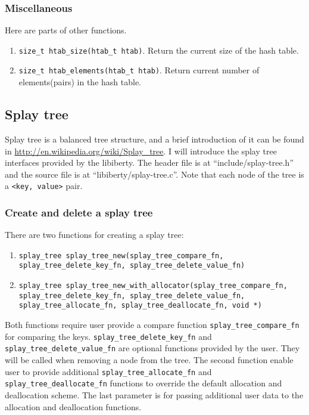 \documentclass[11pt]{article}
\begin{document}
\subsubsection{Miscellaneous}
Here are parts of other functions.
\begin{enumerate}
\item \texttt{size\_t htab\_size(htab\_t htab)}. Return the current size of the hash table.
\item \texttt{size\_t htab\_elements(htab\_t htab)}. Return current number of elements(pairs) in the hash table.
\end{enumerate}

\subsection{Splay tree}
Splay tree is a balanced tree structure, and a brief introduction of it can be found in
\url{http://en.wikipedia.org/wiki/Splay_tree}. I will introduce the splay tree interfaces provided by the libiberty.
The header file is at ``include/splay-tree.h'' and the source file is at ``libiberty/splay-tree.c''.
Note that each node of the tree is a \texttt{<key, value>} pair.

\subsubsection{Create and delete a splay tree}
There are two functions for creating a splay tree:
\begin{enumerate}
\item \texttt{splay\_tree splay\_tree\_new(splay\_tree\_compare\_fn, splay\_tree\_delete\_key\_fn, splay\_tree\_delete\_value\_fn)}
\item \texttt{splay\_tree splay\_tree\_new\_with\_allocator(splay\_tree\_compare\_fn,
        splay\_tree\_delete\_key\_fn, splay\_tree\_delete\_value\_fn,
        splay\_tree\_allocate\_fn, splay\_tree\_deallocate\_fn, void *)}
\end{enumerate}
Both functions require user provide a compare function \texttt{splay\_tree\_compare\_fn} for comparing the keys. \texttt{splay\_tree\_delete\_key\_fn}
and \texttt{splay\_tree\_delete\_value\_fn} are optional functions provided by the user. They will be called when removing a node from the tree. The second 
function enable user to provide additional \texttt{splay\_tree\_allocate\_fn} and \texttt{splay\_tree\_deallocate\_fn} functions to override the default 
allocation and deallocation scheme. The last parameter is for passing additional user data to the allocation and deallocation functions.
\end{document}
